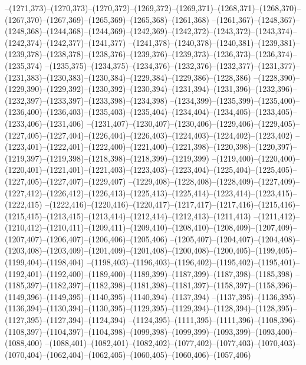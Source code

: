 --(1271,373)--(1270,373)--(1270,372)--(1269,372)--(1269,371)--(1268,371)--(1268,370)--(1267,370)--(1267,369)--(1265,369)--(1265,368)--(1261,368)
--(1261,367)--(1248,367)--(1248,368)--(1244,368)--(1244,369)--(1242,369)--(1242,372)--(1243,372)--(1243,374)--(1242,374)--(1242,377)--(1241,377)
--(1241,378)--(1240,378)--(1240,381)--(1239,381)--(1239,378)--(1238,378)--(1238,376)--(1239,376)--(1239,373)--(1236,373)--(1236,374)--(1235,374)
--(1235,375)--(1234,375)--(1234,376)--(1232,376)--(1232,377)--(1231,377)--(1231,383)--(1230,383)--(1230,384)--(1229,384)--(1229,386)--(1228,386)
--(1228,390)--(1229,390)--(1229,392)--(1230,392)--(1230,394)--(1231,394)--(1231,396)--(1232,396)--(1232,397)--(1233,397)--(1233,398)--(1234,398)
--(1234,399)--(1235,399)--(1235,400)--(1236,400)--(1236,403)--(1235,403)--(1235,404)--(1234,404)--(1234,405)--(1233,405)--(1233,406)--(1231,406)
--(1231,407)--(1230,407)--(1230,406)--(1229,406)--(1229,405)--(1227,405)--(1227,404)--(1226,404)--(1226,403)--(1224,403)--(1224,402)--(1223,402)
--(1223,401)--(1222,401)--(1222,400)--(1221,400)--(1221,398)--(1220,398)--(1220,397)--(1219,397)--(1219,398)--(1218,398)--(1218,399)--(1219,399)
--(1219,400)--(1220,400)--(1220,401)--(1221,401)--(1221,403)--(1223,403)--(1223,404)--(1225,404)--(1225,405)--(1227,405)--(1227,407)--(1229,407)
--(1229,408)--(1228,408)--(1228,409)--(1227,409)--(1227,412)--(1226,412)--(1226,413)--(1225,413)--(1225,414)--(1223,414)--(1223,415)--(1222,415)
--(1222,416)--(1220,416)--(1220,417)--(1217,417)--(1217,416)--(1215,416)--(1215,415)--(1213,415)--(1213,414)--(1212,414)--(1212,413)--(1211,413)
--(1211,412)--(1210,412)--(1210,411)--(1209,411)--(1209,410)--(1208,410)--(1208,409)--(1207,409)--(1207,407)--(1206,407)--(1206,406)--(1205,406)
--(1205,407)--(1204,407)--(1204,408)--(1203,408)--(1203,409)--(1201,409)--(1201,408)--(1200,408)--(1200,405)--(1199,405)--(1199,404)--(1198,404)
--(1198,403)--(1196,403)--(1196,402)--(1195,402)--(1195,401)--(1192,401)--(1192,400)--(1189,400)--(1189,399)--(1187,399)--(1187,398)--(1185,398)
--(1185,397)--(1182,397)--(1182,398)--(1181,398)--(1181,397)--(1158,397)--(1158,396)--(1149,396)--(1149,395)--(1140,395)--(1140,394)--(1137,394)
--(1137,395)--(1136,395)--(1136,394)--(1130,394)--(1130,395)--(1129,395)--(1129,394)--(1128,394)--(1128,395)--(1127,395)--(1127,394)--(1124,394)
--(1124,395)--(1111,395)--(1111,396)--(1108,396)--(1108,397)--(1104,397)--(1104,398)--(1099,398)--(1099,399)--(1093,399)--(1093,400)--(1088,400)
--(1088,401)--(1082,401)--(1082,402)--(1077,402)--(1077,403)--(1070,403)--(1070,404)--(1062,404)--(1062,405)--(1060,405)--(1060,406)--(1057,406)
